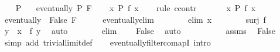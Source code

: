 \begin{isabellebody}
\ \ \isamarkupfalse%
\ P\ \isamarkupfalse%
\ {\isacharasterisk}{\kern0pt}{\isacharcolon}{\kern0pt}\ {\isachardoublequoteopen}eventually\ P\ F{\isachardoublequoteclose}\isanewline
\ \ \isamarkupfalse%
\ {\isachardoublequoteopen}{\isasymexists}x{\isachardot}{\kern0pt}\ P\ {\isacharparenleft}{\kern0pt}f\ x{\isacharparenright}{\kern0pt}{\isachardoublequoteclose}\isanewline
\ \ \isamarkupfalse%
\ {\isacharparenleft}{\kern0pt}rule\ ccontr{\isacharparenright}{\kern0pt}\isanewline
\ \ \ \ \isamarkupfalse%
\ {\isacharasterisk}{\kern0pt}{\isacharasterisk}{\kern0pt}{\isacharcolon}{\kern0pt}\ {\isachardoublequoteopen}{\isasymnot}{\isacharparenleft}{\kern0pt}{\isasymexists}x{\isachardot}{\kern0pt}\ P\ {\isacharparenleft}{\kern0pt}f\ x{\isacharparenright}{\kern0pt}{\isacharparenright}{\kern0pt}{\isachardoublequoteclose}\isanewline
\ \ \ \ \isamarkupfalse%
\ {\isacharasterisk}{\kern0pt}\ \isamarkupfalse%
\ {\isachardoublequoteopen}eventually\ {\isacharparenleft}{\kern0pt}{\isasymlambda}{\isacharunderscore}{\kern0pt}{\isachardot}{\kern0pt}\ False{\isacharparenright}{\kern0pt}\ F{\isachardoublequoteclose}\isanewline
\ \ \ \ \isamarkupfalse%
\ eventually{\isacharunderscore}{\kern0pt}elim\isanewline
\ \ \ \ \ \ \isamarkupfalse%
\ {\isacharparenleft}{\kern0pt}elim\ x{\isacharparenright}{\kern0pt}\isanewline
\ \ \ \ \ \ \isamarkupfalse%
\ {\isacartoucheopen}surj\ f{\isacartoucheclose}\ \isamarkupfalse%
\ y\ \ {\isachardoublequoteopen}x\ {\isacharequal}{\kern0pt}\ f\ y{\isachardoublequoteclose}\ \isamarkupfalse%
\ auto\isanewline
\ \ \ \ \ \ \isamarkupfalse%
\ elim\ \ {\isacharasterisk}{\kern0pt}{\isacharasterisk}{\kern0pt}\ \isamarkupfalse%
\ False\ \isamarkupfalse%
\ auto\isanewline
\ \ \ \ \isamarkupfalse%
\isanewline
\ \ \ \ \isamarkupfalse%
\ assms\ \isamarkupfalse%
\ False\ \isamarkupfalse%
\ {\isacharparenleft}{\kern0pt}simp\ add{\isacharcolon}{\kern0pt}\ trivial{\isacharunderscore}{\kern0pt}limit{\isacharunderscore}{\kern0pt}def{\isacharparenright}{\kern0pt}\isanewline
\ \ \isamarkupfalse%
\isanewline
{}\isamarkupfalse%
%
\endisatagproof
{\isafoldproof}%
%
\isadelimproof
\isanewline
%
\endisadelimproof
\isanewline
{}\isamarkupfalse%
\ eventually{\isacharunderscore}{\kern0pt}filtercomapI\ {\isacharbrackleft}{\kern0pt}intro{\isacharbrackright}{\kern0pt}{\isacharcolon}{\kern0pt}\isanewline

\end{isabellebody}
